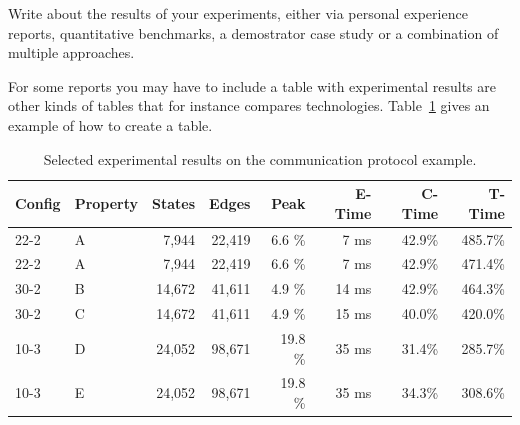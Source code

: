 Write about the results of your experiments, either via personal experience reports, quantitative benchmarks, a demostrator case study or a combination of multiple approaches.


For some reports you may have to include a table with experimental
results are other kinds of tables that for instance compares
technologies. Table~\ref{tab:results} gives an example of how to create a table.

\begin{table}[bth]
	\centering
	\begin{tabular}{llrrrrrr}
		Config & Property & States & Edges & Peak & E-Time & C-Time & T-Time
		\\ \hline \hline
		22-2 & A   &    7,944  &   22,419  &  6.6  \%  &  7 ms & 42.9\% &  485.7\% \\
		22-2 & A   &    7,944  &   22,419  &  6.6  \%  &  7 ms & 42.9\% &  471.4\% \\
		30-2 & B   &   14,672  &   41,611  &  4.9  \%  & 14 ms & 42.9\% &  464.3\% \\
		30-2 & C   &   14,672  &   41,611  &  4.9  \%  & 15 ms & 40.0\% &  420.0\% \\ \hline
		10-3 & D   &   24,052  &   98,671  & 19.8  \%  & 35 ms & 31.4\% &  285.7\% \\
		10-3 & E   &   24,052  &   98,671  & 19.8  \%  & 35 ms & 34.3\% &  308.6\% \\
		\hline \hline
	\end{tabular}
	\caption{Selected experimental results on the communication protocol example.}
	\label{tab:results}
\end{table}
